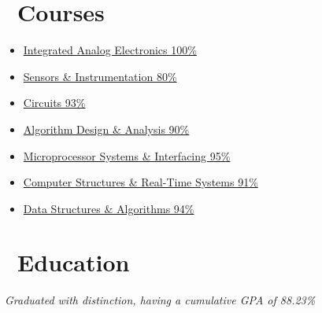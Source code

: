 \documentclass{resume}
\begin{document}

\section{\faBook\ Courses}

\begin{itemize}
  \item \href{http://www.ucalendar.uwaterloo.ca/1617/COURSE/course-ECE.html#ECE444}{Integrated Analog Electronics \hfill 100\%}
  \item \href{http://www.ucalendar.uwaterloo.ca/1516/COURSE/course-MTE.html#MTE220}{Sensors \& Instrumentation \hfill 80\%}
  \item \href{http://www.ucalendar.uwaterloo.ca/1516/COURSE/course-MTE.html#MTE120}{Circuits \hfill 93\%}
\end{itemize}

\begin{itemize}
  \item \href{http://www.ucalendar.uwaterloo.ca/1617/COURSE/course-ECE.html#ECE406}{Algorithm Design \& Analysis \hfill 90\%}
  \item \href{http://www.ucalendar.uwaterloo.ca/1516/COURSE/course-MTE.html#MTE341}{Microprocessor Systems \& Interfacing \hfill 95\%}
  \item \href{http://www.ucalendar.uwaterloo.ca/1516/COURSE/course-MTE.html#MTE241}{Computer Structures \& Real-Time Systems \hfill 91\%}
  \item \href{http://www.ucalendar.uwaterloo.ca/1516/COURSE/course-MTE.html#MTE262}{Data Structures \& Algorithms \hfill 94\%}
\end{itemize}



\section{\faGraduationCap\ Education}
\textit{Graduated with distinction, having a cumulative GPA of 88.23\%}

\end{document}
